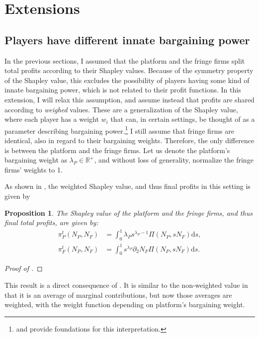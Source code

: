 \documentclass[a4paper]{article}
\newtheorem{proposition}{Proposition}
\newcommand{\ds}{\mathrm{d}s}
\begin{document}
\appendix

\printbibliography


\section{Extensions}
\label{sec:extensions}

\subsection{Players have different innate bargaining power}
\label{sec:higher_bargaining_power}

In the previous sections, I assumed that the platform and the fringe firms split total profits according to their Shapley values.
Because of the symmetry property of the Shapley value, this excludes the possibility of players having some kind of innate bargaining power, which is not related to their profit functions.
In this extension, I will relax this assumption, and assume instead that profits are shared according to \emph{weighed} values.
These are a generalization of the Shapley value, where each player has a weight $w_i$ that can, in certain settings, be thought of as a parameter describing bargaining power.\footnote{
    \textcite{hart1996bargaining} and \textcite{stole1996intra} provide foundations for this interpretation.
}
I still assume that fringe firms are identical, also in regard to their bargaining weights.
Therefore, the only difference is between the platform and the fringe firms.
Let us denote the platform's bargaining weight as $\lambda_P \in \mathbb{R}^+$, and without loss of generality, normalize the fringe firms' weights to 1.

As shown in , the weighted Shapley value, and thus final profits in this setting is given by
\begin{proposition}
    \label{prop:weighted_shapley_value}
    The Shapley value of the platform and the fringe firms, and thus final total profits, are given by:
    \begin{align*}
        \pi^t_P(N_P, N_F) &= \int_0^1 \lambda_P s ^ {\lambda_P - 1} \Pi(N_P,s N_F) \ds, \\
        \pi^t_F(N_P, N_F) &= \int_0^1 s ^ {\lambda_P} \partial_2 N_F \Pi(N_P,s N_F) \ds.
    \end{align*}
\end{proposition}
\begin{proof}[Proof of ]
\end{proof}
This result is a direct consequence of .
It is similar to the non-weighted value in that it is an average of marginal contributions, but now those averages are weighted, with the weight function depending on platform's bargaining weight.
\end{document}

